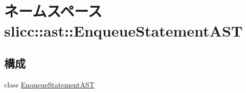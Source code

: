 \hypertarget{namespaceslicc_1_1ast_1_1EnqueueStatementAST}{
\section{ネームスペース slicc::ast::EnqueueStatementAST}
\label{namespaceslicc_1_1ast_1_1EnqueueStatementAST}
}
\subsection*{構成}
\begin{DoxyCompactItemize}
\item 
class \hyperlink{classslicc_1_1ast_1_1EnqueueStatementAST_1_1EnqueueStatementAST}{EnqueueStatementAST}
\end{DoxyCompactItemize}
